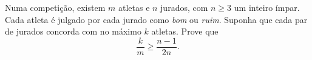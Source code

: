 Numa competição, existem $m$ atletas e $n$ jurados, com $n\geq 3$ um inteiro ímpar. Cada atleta é julgado por cada jurado como \emph{bom} ou \emph{ruim}. Suponha que cada par de jurados concorda com no máximo $k$ atletas. Prove que \[{\frac{k}{m}} \geq {\frac{n-1}{2n}}. \]
